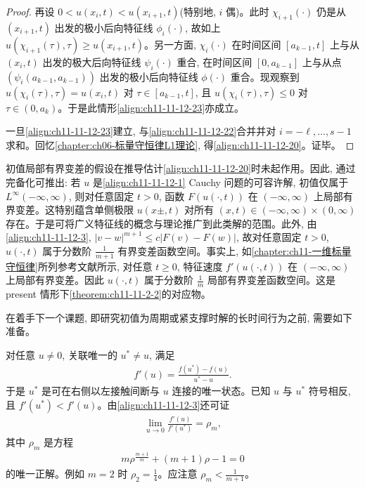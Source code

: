 \documentclass[../../main.tex]{subfiles}
\begin{document}
\begin{proof}
再设 $0<u(x_i,t)<u(x_{i+1},t)$(特别地, $i$ 偶)。此时 $\chi_{i+1}(\cdot)$ 仍是从 $(x_{i+1},t)$ 出发的极小后向特征线 $\phi_i(\cdot)$, 故如上 $u(\chi_{i+1}(\tau),\tau)\geqslant u(x_{i+1},t)$。另一方面, $\chi_i(\cdot)$ 在时间区间 $[a_{k-1},t]$ 上与从 $(x_i,t)$ 出发的极大后向特征线 $\psi_i(\cdot)$ 重合, 在时间区间 $[0,a_{k-1}]$ 上与从点 $(\psi_i(a_{k-1},a_{k-1}))$ 出发的极小后向特征线 $\phi(\cdot)$ 重合。现观察到 $u(\chi_i(\tau),\tau)=u(x_i,t)$ 对 $\tau\in[a_{k-1},t]$, 且 $u(\chi_i(\tau),\tau)\leqslant0$ 对 $\tau\in(0,a_k)$。于是此情形\eqref{align:ch11-11-12-23}亦成立。

一旦\eqref{align:ch11-11-12-23}建立, 与\eqref{align:ch11-11-12-22}合并并对 $i=-\ell,\ldots,s-1$ 求和。回忆\cref{chapter:ch06-标量守恒律L1理论}, 得\eqref{align:ch11-11-12-20}。证毕。

\end{proof}

初值局部有界变差的假设在推导估计\eqref{align:ch11-11-12-20}时未起作用。因此, 通过完备化可推出: 若 $u$ 是\eqref{align:ch11-11-12-1} Cauchy 问题的可容许解, 初值仅属于 $L^\infty(-\infty,\infty)$, 则对任意固定 $t>0$, 函数 $F(u(\cdot,t))$ 在 $(-\infty,\infty)$ 上局部有界变差。这特别蕴含单侧极限 $u(x\pm,t)$ 对所有 $(x,t)\in(-\infty,\infty)\times(0,\infty)$ 存在。于是可将广义特征线的概念与理论推广到此类解的范围。此外, 由\eqref{align:ch11-11-12-3}, $|v-w|^{m+1}\leqslant c|F(v)-F(w)|$, 故对任意固定 $t>0$, $u(\cdot,t)$ 属于分数阶 $\frac{1}{m+1}$ 有界变差函数空间。事实上, 如\cref{chapter:ch11-一维标量守恒律}所列参考文献所示, 对任意 $t\geqslant0$, 特征速度 $f'(u(\cdot,t))$ 在 $(-\infty,\infty)$ 上局部有界变差。因此 $u(\cdot,t)$ 属于分数阶 $\frac{1}{m}$ 局部有界变差函数空间。这是 present 情形下\cref{theorem:ch11-11-2-2}的对应物。


在着手下一个课题, 即研究初值为周期或紧支撑时解的长时间行为之前, 需要如下准备。

对任意 $u\neq0$, 关联唯一的 $u^*\neq u$, 满足
\begin{align}
f'(u)=\frac{f(u^*)-f(u)}{u^*-u}.\label{align:ch11-11-12-24}
\end{align}
于是 $u^*$ 是可在右侧以左接触间断与 $u$ 连接的唯一状态。已知 $u$ 与 $u^*$ 符号相反, 且 $f'(u^*)<f'(u)$。由\eqref{align:ch11-11-12-3}还可证
\begin{align}
\lim_{u\to0}\frac{f'(u)}{f'(u^*)}=\rho_m,\label{align:ch11-11-12-25}
\end{align}
其中 $\rho_m$ 是方程
\begin{align}
m\rho^{\frac{m+1}{m}}+(m+1)\rho-1=0\label{align:ch11-11-12-26}
\end{align}
的唯一正解。例如 $m=2$ 时 $\rho_2=\frac14$。应注意 $\rho_m<\frac{1}{m+1}$。
\end{document}
